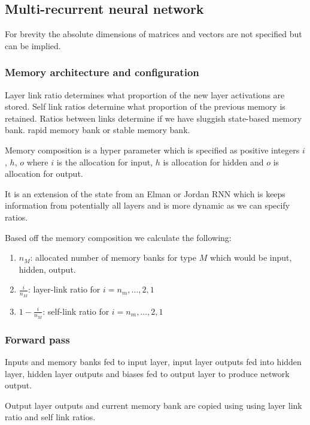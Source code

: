 \documentclass[conference]{IEEEtran}
\begin{document}
\subsection{Multi-recurrent neural network}

For brevity the absolute dimensions of matrices and vectors are not specified but can be implied.

\subsubsection{Memory architecture and configuration}

Layer link ratio determines what proportion of the new layer activations are stored. Self link ratios determine what proportion of the previous memory is retained. Ratios between links determine if we have sluggish state-based memory bank. rapid memory bank or stable memory bank.

Memory composition is a hyper parameter which is specified as positive integers $i$, $h$, $o$ where $i$ is the allocation for input, $h$ is allocation for hidden and $o$ is allocation for output.

It is an extension of the state from an Elman or Jordan RNN which is keeps information from potentially all layers and is more dynamic as we can specify ratios.

Based off the memory composition we calculate the following:

\begin{enumerate}
	\item $n_M$: allocated number of memory banks for type $M$ which would be input, hidden, output.
	\item $\frac{i}{n_M}$: layer-link ratio for $i=n_m, \dots, 2, 1$
	\item $1 - \frac{i}{n_M}$: self-link ratio for $i=n_m, \dots, 2, 1$
\end{enumerate}





\subsubsection{Forward pass}

Inputs and memory banks fed to input layer, input layer outputs fed into hidden layer, hidden layer outputs and biases fed to output layer to produce network output.

Output layer outputs and current memory bank are copied using using layer link ratio and self link ratios.
\end{document}

